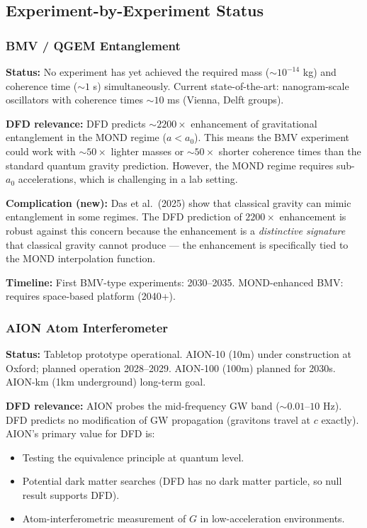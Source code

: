 \documentclass[11pt,a4paper]{article}
\begin{document}
\subsection{Experiment-by-Experiment Status}

\subsubsection{BMV / QGEM Entanglement}

\textbf{Status:} No experiment has yet achieved the required mass ($\sim 10^{-14}$ kg) and coherence time ($\sim 1$ s) simultaneously. Current state-of-the-art: nanogram-scale oscillators with coherence times $\sim 10$ ms (Vienna, Delft groups).

\textbf{DFD relevance:} DFD predicts $\sim 2200\times$ enhancement of gravitational entanglement in the MOND regime ($a < a_0$). This means the BMV experiment could work with $\sim 50\times$ lighter masses or $\sim 50\times$ shorter coherence times than the standard quantum gravity prediction. However, the MOND regime requires sub-$a_0$ accelerations, which is challenging in a lab setting.

\textbf{Complication (new):} Das et al.\ (2025) show that classical gravity can mimic entanglement in some regimes. The DFD prediction of $2200\times$ enhancement is robust against this concern because the enhancement is a \emph{distinctive signature} that classical gravity cannot produce --- the enhancement is specifically tied to the MOND interpolation function.

\textbf{Timeline:} First BMV-type experiments: 2030--2035. MOND-enhanced BMV: requires space-based platform (2040+).

\subsubsection{AION Atom Interferometer}

\textbf{Status:} Tabletop prototype operational. AION-10 (10m) under construction at Oxford; planned operation 2028--2029. AION-100 (100m) planned for 2030s. AION-km (1km underground) long-term goal.

\textbf{DFD relevance:} AION probes the mid-frequency GW band ($\sim 0.01$--$10$ Hz). DFD predicts no modification of GW propagation (gravitons travel at $c$ exactly). AION's primary value for DFD is:
\begin{itemize}
\item Testing the equivalence principle at quantum level.
\item Potential dark matter searches (DFD has no dark matter particle, so null result supports DFD).
\item Atom-interferometric measurement of $G$ in low-acceleration environments.
\end{itemize}
\end{document}
